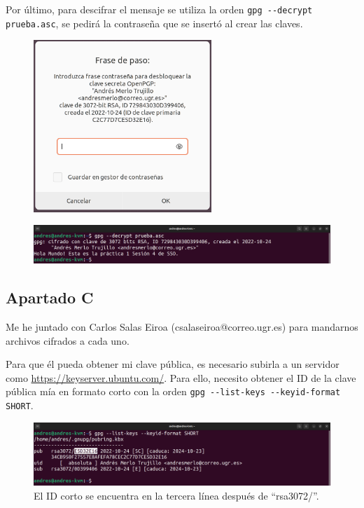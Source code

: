 \documentclass{article}
\begin{document}
Por último, para descifrar el mensaje se utiliza la orden \verb|gpg --decrypt prueba.asc|, se pedirá la contraseña que se insertó al crear las claves.

\begin{figure}[H]
    \centering
    \includegraphics[width=0.6\textwidth]{imagenes/Portatil/Captura desde 2022-10-24 12-17-29.png}
\end{figure}

\begin{figure}[H]
    \includegraphics[width=\textwidth]{imagenes/Portatil/Captura desde 2022-10-27 18-35-01.png}
\end{figure}

\newpage

\subsection*{Apartado C}

Me he juntado con Carlos Salas Eiroa (csalaseiroa@correo.ugr.es) para mandarnos archivos cifrados a cada uno.

Para que él pueda obtener mi clave pública, es necesario subirla a un servidor como \url{https://keyserver.ubuntu.com/}. Para ello, necesito obtener el ID de la clave pública mía en formato corto con la orden \verb|gpg --list-keys --keyid-format SHORT|.


\begin{figure}[H]
    \includegraphics[width=\textwidth]{imagenes/Portatil/Captura desde 2022-10-24 11-54-58.png}
    \caption{El ID corto se encuentra en la tercera línea después de ``rsa3072/''.}
\end{figure}
\end{document}
